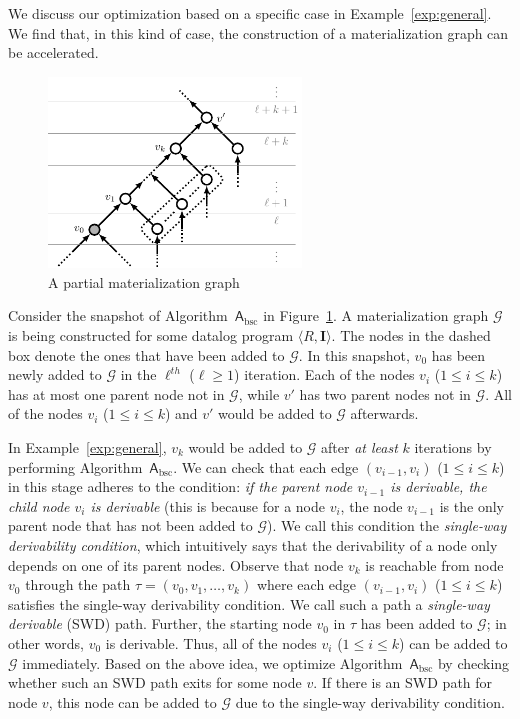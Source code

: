 We discuss our optimization based on a specific case in Example~\ref{exp:general}.
We find that, in this kind of case, the construction of a materialization graph can be accelerated.

\begin{figure}[htbp]
\begin{center}
\includegraphics[width=0.6\textwidth]{fig-general.pdf}
\caption{A partial materialization graph}
\label{fig:general}
\end{center}
\end{figure}

\begin{example}\label{exp:general}
Consider the  snapshot of Algorithm~$\mathsf{A}_{\text{bsc}}$ in
Figure~\ref{fig:general}. A materialization graph $\mathcal{G}$
is being constructed for some datalog program $\langle R, \textbf{I}\rangle$.
The nodes in the dashed box denote the ones that have been added to $\mathcal{G}$.
In this snapshot, $v_0$ has been newly added
to $\mathcal{G}$ in the $\ell^{th}$ ($\ell\geq 1$) iteration.
Each of the nodes $v_i$ ($1\leq i\leq k$) has at most one parent node not in $\mathcal{G}$,
while $v'$ has two parent nodes not in $\mathcal{G}$.
All of the nodes $v_i$ ($1\leq i\leq k$) and $v'$ would be added to $\mathcal{G}$
afterwards.
\end{example}


In Example~\ref{exp:general}, $v_k$ would be added to $\mathcal{G}$ after \emph{at least} $k$
iterations by performing Algorithm~$\mathsf{A}_{\text{bsc}}$.
We can check that each edge $(v_{i-1},v_i)$ ($1\leq i\leq k$) in this
stage adheres to the condition:
\emph{if the parent node $v_{i-1}$ is derivable, the child node $v_i$ is derivable} (this
is because for a node $v_i$, the node $v_{i-1}$ is the only parent node that has not been added to $\mathcal{G}$).
We call this condition the \emph{single-way derivability condition}, which intuitively says that the derivability of a
node only depends on one of its parent nodes.
Observe that node $v_k$ is reachable from node $v_0$ through the path $\tau=(v_0,v_1,\ldots,v_k)$ where
each edge $(v_{i-1},v_i)$ ($1\leq i\leq k$) satisfies the single-way derivability condition.
We call such a path a \emph{single-way derivable} (SWD) path.
Further, the starting node $v_0$ in $\tau$ has been added to $\mathcal{G}$; in other words,
$v_0$ is derivable. Thus, all of the nodes $v_i$ ($1\leq i\leq k$) can be added to
$\mathcal{G}$ immediately.
Based on the above idea, we optimize Algorithm~$\mathsf{A}_{\text{bsc}}$ by checking whether such an SWD path
exits for some node $v$. If there is an SWD path for node $v$, this node can be added to $\mathcal{G}$
due to the single-way derivability condition.

